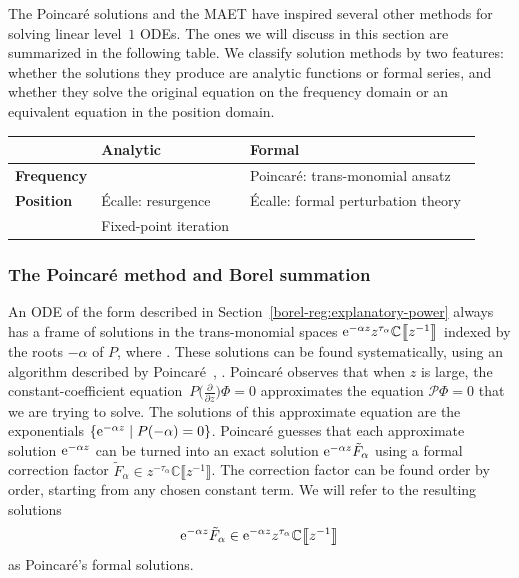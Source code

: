 \documentclass[10pt,a4paper]{amsart}
\newcommand{\C}{\mathbb{C}}
\newcommand{\series}[1]{\tilde{#1}}
\numberwithin{equation}{section}
\begin{document}
The Poincar\'e solutions and the MAET have inspired several other methods for solving linear level~$1$ ODEs. The ones we will discuss in this section are summarized in the following table. We classify solution methods by two features: whether the solutions they produce are analytic functions or formal series, and whether they solve the original equation on the frequency domain or an equivalent equation in the position domain.
\begin{center}
\begin{tabular}{l|l|l}
& \textbf{Analytic} & \textbf{Formal} \\ \hline
\textbf{Frequency} & & Poincar\'e: trans-monomial ansatz~\cite{int-irreg} \\ \hline
\textbf{Position} & \'{E}calle: resurgence & \'{E}calle: formal perturbation theory~\cite{EcalleIII,loday-Remy2011} \\
& Fixed-point iteration~\cite{reg-sing-volterra} \\
\end{tabular}
\end{center}

\subsubsection{The Poincar\'e method and Borel summation}\label{sec:Poincare method}
%
An ODE of the form described in Section~\ref{borel-reg:explanatory-power} always has a frame of solutions in the trans-monomial spaces ${\rm e}^{-\alpha z} z^{\tau_\alpha} \C\big\llbracket z^{-1} \big\rrbracket$ indexed by the roots $-\alpha$ of $P$, where . These solutions can be found systematically, using an algorithm described by Poincar\'e~\cite{int-irreg}, \cite[Proposition~2.2.7, p.~111]{EcalleIII}. Poincar\'e observes that when $z$ is large, the constant-coefficient equation~$P\bigl(\frac{\partial}{\partial z}\bigr) \Phi = 0$ approximates the equation $\mathcal{P}\Phi = 0$ that we are trying to solve. The solutions of this approximate equation are the exponentials $\{{\rm e}^{-\alpha z} \mid P(-\alpha) = 0\}$. Poincar\'e guesses that each approximate solution ${\rm e}^{-\alpha z}$ can be turned into an exact solution ${\rm e}^{-\alpha z} \series{F}_\alpha$ using a formal correction factor $\series{F}_\alpha \in z^{-\tau_\alpha} \C\big\llbracket z^{-1} \big\rrbracket$. The correction factor can be found order by order, starting from any chosen constant term. We will refer to the resulting solutions \[{\rm e}^{-\alpha z} \series{F}_\alpha \in {\rm e}^{-\alpha z} z^{\tau_\alpha} \C\big\llbracket z^{-1} \big\rrbracket\] as Poincar\'e's formal solutions.
\end{document}
